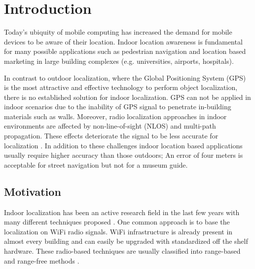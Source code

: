 
\chapter{Introduction} %

\label{Chapter1} %


\newcommand{\keyword}[1]{\textbf{#1}}
\newcommand{\tabhead}[1]{\textbf{#1}}
\newcommand{\code}[1]{\texttt{#1}}
\newcommand{\file}[1]{\texttt{\bfseries#1}}
\newcommand{\option}[1]{\texttt{\itshape#1}}


Today's ubiquity of mobile computing has increased the demand for mobile devices to be aware of their location. Indoor location awareness is fundamental for many possible applications such as pedestrian navigation and location based marketing in large building complexes (e.g. universities, airports, hospitals).

In contrast to outdoor localization, where the Global Positioning System (GPS) is the most attractive and effective technology to perform object localization, there is no established solution for indoor localization. GPS can not be applied in indoor scenarios due to the inability of GPS signal to penetrate in-building materials such  as walls. Moreover, radio localization approaches in indoor environments are affected by non-line-of-sight (NLOS) and multi-path propagation. These effects deteriorate the signal to be less accurate for localization \cite{JoseMaster,multipathEffects}. In addition to these challenges indoor location based applications usually require higher accuracy than those outdoors; An error of four meters is acceptable for street navigation but not for a museum guide.

\section{Motivation}

Indoor localization has been an active research field in the last few years with many different techniques proposed \cite{surveyIndoorTechniques,surveyWirelessPersonal}. One common approach is to base the localization on WiFi radio signals. WiFi infrastructure is already present in almost every building and can easily be upgraded with standardized off the shelf hardware. These radio-based techniques are usually classified into range-based and range-free methods \cite{FineGrainedIndoorTracking}.

